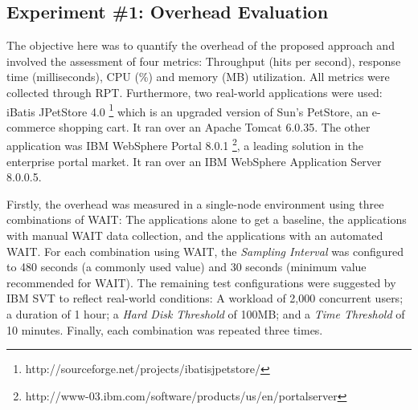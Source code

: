 \documentclass[runningheads,a4paper]{llncs}
\newcommand{\myspaceM}{-7.6pt}
\begin{document}
\vspace{\myspaceM{}}
\subsection{Experiment \#1: Overhead Evaluation}
\vspace{\myspaceM{}}

The objective here was to quantify the overhead of the proposed approach and
involved the assessment of four metrics: Throughput (hits per second), response
time (milliseconds), CPU (\%) and memory (MB) utilization. All metrics were
collected through RPT. Furthermore, two real-world applications were used:
iBatis JPetStore 4.0 \footnote{http://sourceforge.net/projects/ibatisjpetstore/}
which is an upgraded version of Sun's PetStore, an e-commerce shopping cart. It
ran over an Apache Tomcat 6.0.35. The other application was IBM WebSphere Portal 
8.0.1 \footnote{http://www-03.ibm.com/software/products/us/en/portalserver},
a leading solution in the enterprise portal market. It ran over an IBM WebSphere
Application Server 8.0.0.5.


Firstly, the overhead was measured in a single-node environment using three
combinations of WAIT: The applications alone to get a baseline, the applications
with manual WAIT data collection, and the applications with an automated
WAIT. For each combination using WAIT, the \emph{Sampling Interval} was
configured to 480 seconds (a commonly used value) and 30 seconds (minimum value 
recommended for WAIT). The remaining test configurations were suggested by IBM SVT to
reflect real-world conditions: A workload of 2,000 concurrent users; a duration
of 1 hour; a \emph{Hard Disk Threshold} of 100MB; and a \emph{Time Threshold} of
10 minutes. Finally, each combination was repeated three times.
\end{document}
